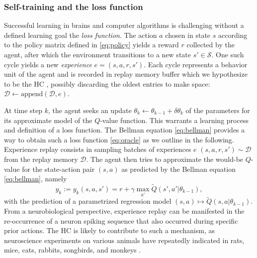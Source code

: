 \documentclass[10pt,letterpaper]{article}
\begin{document}
\subsubsection{Self-training and the loss function}
Successful learning in brains and computer algorithms is challenging without a
defined learning goal \textemdash the \textit{loss function}.
The action $a$ chosen in state $s$ according to the policy matrix defined in
\eqref{eq:policy} yields a reward $r$ collected by the agent,
after which the environment transitions to a new state $s' \in \mathcal S$.
One such cycle yields a new \textit{experience} $e = (s,a,r,s')$.
Each cycle represents a behavior unit of the agent
and is recorded in replay memory buffer \textemdash which we hypothesize to be the
HC \textemdash, possibly discarding the oldest entries to make space:
$\mathcal D \leftarrow \text{append}(\mathcal D, e)$.



At time step $k$, the agent seeks an update $\theta_{k} \leftarrow \theta_{k-1} + \delta \theta_{k}$ of the parameters for its approximate model of the $Q$-value function. This warrants a learning process
and definition of a loss function.
The Bellman equation \eqref{eq:bellman} provides a way to obtain such a loss function \eqref{eq:oracle} as we outline in the following.
Experience replay consists in sampling
batches of experiences $e$
$(s, a, r, s') \sim \mathcal D$ from the replay memory $\mathcal D$.
The agent then tries to approximate
the would-be $Q$-value for the state-action pair $(s,a)$ as predicted by the Bellman equation \eqref{eq:bellman}, namely
\begin{equation}
  y_k := y_k(s,a,s') =  r + \gamma \max_{a'} \tilde{Q}(s', a'|\theta_{k-1}),
\end{equation}
with the prediction of a parametrized regression model $(s,a)
\mapsto \tilde{Q}(s, a|\theta_{k-1})$.
From a neurobiological perspective,
experience replay can be manifested in the re-occurrence of a
neuron spiking sequence that also occurred during specific prior actions.
The HC is likely to contribute to such a mechanism,
as neuroscience experiments on various animals have repeatedly indicated
in rats, mice, cats, rabbits, songbirds, and
monkeys \citep{buhry2011,nokia2010,dave2000,skaggs2007}.
\end{document}
